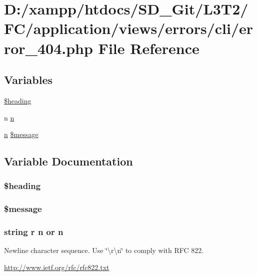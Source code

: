 \hypertarget{cli_2error__404_8php}{}\section{D\+:/xampp/htdocs/\+S\+D\+\_\+\+Git/\+L3\+T2/\+F\+C/application/views/errors/cli/error\+\_\+404.php File Reference}
\label{cli_2error__404_8php}
\subsection*{Variables}
\begin{DoxyCompactItemize}
\item 
\hyperlink{cli_2error__404_8php_a196169be7715d466e3310388b096598c}{\$heading}
\item 
n \hyperlink{cli_2error__404_8php_a958071ac50ebec838e917de66e151e7e}{n}
\item 
\hyperlink{cli_2error__general_8php_ace0fd03cd383f20ce6ea63247a207294}{n} \hyperlink{cli_2error__404_8php_aaba2b6aee423b3b5e46000f90b4c8c7f}{\$message}
\end{DoxyCompactItemize}


\subsection{Variable Documentation}
\hypertarget{cli_2error__404_8php_a196169be7715d466e3310388b096598c}{}
\subsubsection[{\$heading}]{\setlength{\rightskip}{0pt plus 5cm}\$heading}\label{cli_2error__404_8php_a196169be7715d466e3310388b096598c}
\hypertarget{cli_2error__404_8php_aaba2b6aee423b3b5e46000f90b4c8c7f}{}
\subsubsection[{\$message}]{ \$message}\label{cli_2error__404_8php_aaba2b6aee423b3b5e46000f90b4c8c7f}
\hypertarget{cli_2error__404_8php_a958071ac50ebec838e917de66e151e7e}{}
\subsubsection[{n}]{\setlength{\rightskip}{0pt plus 5cm}string {\bf r} n or n}\label{cli_2error__404_8php_a958071ac50ebec838e917de66e151e7e}
Newline character sequence. Use \char`\"{}\textbackslash{}r\textbackslash{}n\char`\"{} to comply with R\+F\+C 822.

\hyperlink{}{http\+://www.\+ietf.\+org/rfc/rfc822.\+txt}
